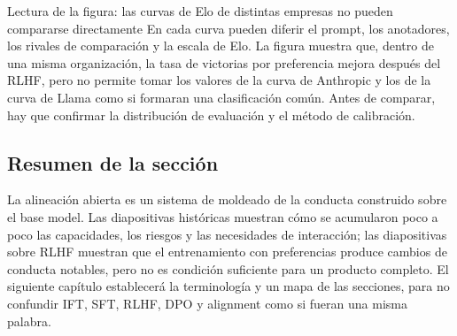 


\begin{knowledgebox}{Lectura de la figura: las curvas de Elo de distintas empresas no pueden compararse directamente}
En cada curva pueden diferir el prompt, los anotadores, los rivales de comparación y la escala de Elo. La figura muestra que, dentro de una misma organización, la tasa de victorias por preferencia mejora después del RLHF, pero no permite tomar los valores de la curva de Anthropic y los de la curva de Llama como si formaran una clasificación común. Antes de comparar, hay que confirmar la distribución de evaluación y el método de calibración.
\end{knowledgebox}


\subsection{Resumen de la sección}

La alineación abierta es un sistema de moldeado de la conducta construido sobre el base model. Las diapositivas históricas muestran cómo se acumularon poco a poco las capacidades, los riesgos y las necesidades de interacción; las diapositivas sobre RLHF muestran que el entrenamiento con preferencias produce cambios de conducta notables, pero no es condición suficiente para un producto completo. El siguiente capítulo establecerá la terminología y un mapa de las secciones, para no confundir IFT, SFT, RLHF, DPO y alignment como si fueran una misma palabra.
